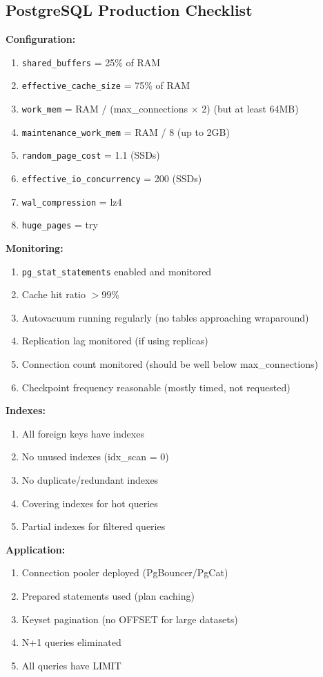 \documentclass[12pt,a4paper]{article}
\begin{document}
\subsection{PostgreSQL Production Checklist}

\begin{tipbox}
\textbf{Configuration:}
\begin{enumerate}[label=$\square$]
    \item \texttt{shared\_buffers} = 25\% of RAM
    \item \texttt{effective\_cache\_size} = 75\% of RAM
    \item \texttt{work\_mem} = RAM / (max\_connections $\times$ 2) (but at least 64MB)
    \item \texttt{maintenance\_work\_mem} = RAM / 8 (up to 2GB)
    \item \texttt{random\_page\_cost} = 1.1 (SSDs)
    \item \texttt{effective\_io\_concurrency} = 200 (SSDs)
    \item \texttt{wal\_compression} = lz4
    \item \texttt{huge\_pages} = try
\end{enumerate}

\textbf{Monitoring:}
\begin{enumerate}[label=$\square$]
    \item \texttt{pg\_stat\_statements} enabled and monitored
    \item Cache hit ratio $> 99\%$
    \item Autovacuum running regularly (no tables approaching wraparound)
    \item Replication lag monitored (if using replicas)
    \item Connection count monitored (should be well below max\_connections)
    \item Checkpoint frequency reasonable (mostly timed, not requested)
\end{enumerate}

\textbf{Indexes:}
\begin{enumerate}[label=$\square$]
    \item All foreign keys have indexes
    \item No unused indexes (idx\_scan = 0)
    \item No duplicate/redundant indexes
    \item Covering indexes for hot queries
    \item Partial indexes for filtered queries
\end{enumerate}

\textbf{Application:}
\begin{enumerate}[label=$\square$]
    \item Connection pooler deployed (PgBouncer/PgCat)
    \item Prepared statements used (plan caching)
    \item Keyset pagination (no OFFSET for large datasets)
    \item N+1 queries eliminated
    \item All queries have LIMIT
\end{enumerate}
\end{tipbox}
\end{document}
